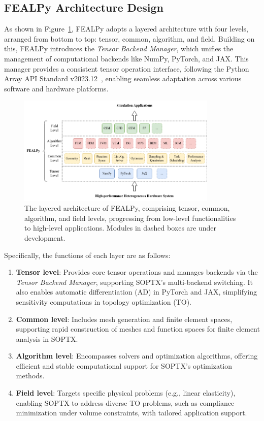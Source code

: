 \documentclass[mathpazo]{cicp}
\begin{document}
\subsection{FEALPy Architecture Design}
As shown in Figure~\ref{fs:fig1}, FEALPy adopts a layered architecture with four levels, arranged from bottom to top: tensor, common, algorithm, and field. Building on this, FEALPy introduces the \textit{Tensor Backend Manager}, which unifies the management of computational backends like NumPy, PyTorch, and JAX. This manager provides a consistent tensor operation interface, following the Python Array API Standard v2023.12~\cite{arrayapi2023}, enabling seamless adaptation across various software and hardware platforms.
\begin{figure}[!htbp]
	\centering
	\includegraphics[width=0.85\textwidth]{figures/fealpy_structure.png}
	\caption{The layered architecture of FEALPy, comprising tensor, common, algorithm, and field levels, progressing from low-level functionalities to high-level applications. Modules in dashed boxes are under development.}
	\label{fs:fig1}
\end{figure}

Specifically, the functions of each layer are as follows:
\begin{enumerate} 
	\item \textbf{Tensor level}: Provides core tensor operations and manages backends via the \textit{Tensor Backend Manager}, supporting SOPTX’s multi-backend switching. It also enables automatic differentiation (AD) in PyTorch and JAX, simplifying sensitivity computations in topology optimization (TO).
	\item \textbf{Common level}: Includes mesh generation and finite element spaces, supporting rapid construction of meshes and function spaces for finite element analysis in SOPTX.
	\item \textbf{Algorithm level}: Encompasses solvers and optimization algorithms, offering efficient and stable computational support for SOPTX’s optimization methods.
	\item \textbf{Field level}: Targets specific physical problems (e.g., linear elasticity), enabling SOPTX to address diverse TO problems, such as compliance minimization under volume constraints, with tailored application support.
\end{enumerate}
\end{document}
